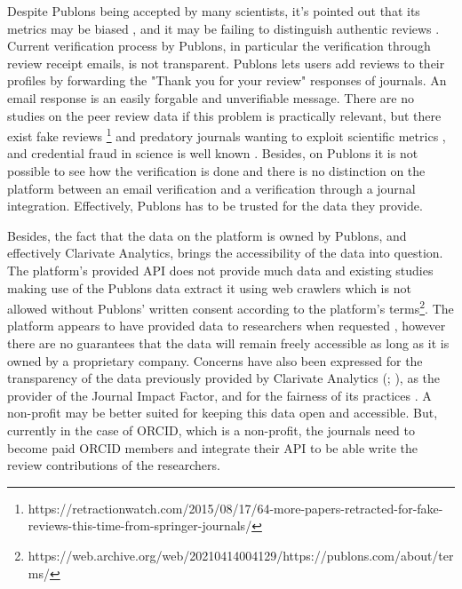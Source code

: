 Despite Publons being accepted by many scientists, it’s pointed out that its metrics may be biased \parencite{Ortega.2019}, and it may be failing to distinguish authentic reviews \parencite{TeixeiradaSilva.2020}. Current verification process by Publons, in particular the verification through review receipt emails, is not transparent. Publons lets users add reviews to their profiles by forwarding the "Thank you for your review" responses of journals. An email response is an easily forgable and unverifiable message. There are no studies on the peer review data if this problem is practically relevant, but there exist fake reviews \footnote{https://retractionwatch.com/2015/08/17/64-more-papers-retracted-for-fake-reviews-this-time-from-springer-journals/} \parencite{Qi.2017, TeixeiradaSilva.2017} and predatory journals wanting to exploit scientific metrics \parencite{xia2015publishes, demir2018predatory}, and credential fraud in science is well known \parencite{Wilson.2020}. Besides, on Publons it is not possible to see how the verification is done and there is no distinction on the platform between an email verification and a verification through a journal integration. Effectively, Publons has to be trusted for the data they provide.

Besides, the fact that the data on the platform is owned by Publons, and effectively Clarivate Analytics, brings the accessibility of the data into question. The platform’s provided API does not provide much data and existing studies making use of the Publons data extract it using web crawlers \parencite[952]{Ortega.2017} which is not allowed without Publons’ written consent according to the platform’s terms\footnote{https://web.archive.org/web/20210414004129/https://publons.com/about/terms/}. The platform appears to have provided data to researchers when requested \parencite[12]{Kovanis.2016}, however there are no guarantees that the data will remain freely accessible as long as it is owned by a proprietary company. Concerns have also been expressed for the transparency of the data previously provided by Clarivate Analytics (\cite{Rossner.2007}; \cite[3]{TeixeiradaSilva.2019}), as the provider of the Journal Impact Factor, and for the fairness of its practices \parencite{TeixeiradaSilva.2013}. A non-profit may be better suited for keeping this data open and accessible. But, currently in the case of \acrshort{ORCID}, which is a non-profit, the journals need to become paid \acrshort{ORCID} members and integrate their \acrshort{API} to be able write the review contributions of the researchers.

